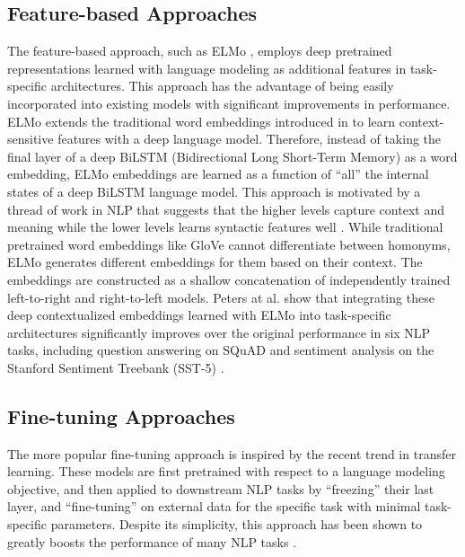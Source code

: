 \subsection{Feature-based Approaches}

The feature-based approach, such as ELMo \cite{peters2018deep}, employs deep pretrained representations learned with language modeling as additional features in task-specific architectures.
This approach has the advantage of being easily incorporated into existing models with significant improvements in performance.
ELMo \cite{peters2018deep} extends the traditional word embeddings introduced in  to learn context-sensitive features with a deep language model.
Therefore, instead of taking the final layer of a deep BiLSTM (Bidirectional Long Short-Term Memory) as a word embedding, ELMo embeddings are learned as a function of ``all'' the internal states of a deep BiLSTM language model.
This approach is motivated by a thread of work in NLP that suggests that the higher levels capture context \cite{melamud2016context2vec} and meaning while the lower levels learns syntactic features well \cite{belinkov2017neural}.
While traditional pretrained word embeddings like GloVe \cite{pennington2014glove} cannot differentiate between homonyms, ELMo generates different embeddings for them based on their context.
The embeddings are constructed as a shallow concatenation of independently trained left-to-right and right-to-left models.
Peters at al. \cite{peters2018deep} show that integrating these deep contextualized embeddings learned with ELMo into task-specific architectures significantly improves over the original performance in six NLP tasks, including question answering on SQuAD \cite{rajpurkar2016squad} and sentiment analysis on the Stanford Sentiment Treebank (SST-5) \cite{socher2013recursive}.

\subsection{Fine-tuning Approaches}

The more popular fine-tuning approach is inspired by the recent trend in transfer learning.
These models are first pretrained with respect to a language modeling objective, and then applied to downstream NLP tasks by ``freezing'' their last layer, and ``fine-tuning'' on external data for the specific task with minimal task-specific parameters.
Despite its simplicity, this approach has been shown to greatly boosts the performance of many NLP tasks .

